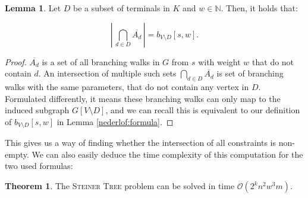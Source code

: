 \documentclass[thesis=M,english,hidelinks]{FITthesis}[2012/10/20]
\theoremstyle{definition}
\newtheorem{theorem}{Theorem}
\newtheorem{lemma}{Lemma}
\begin{document}
\begin{lemma}
    \label{nederlof:subset}
    Let $D$ be a subset of terminals in $K$ and $w \in \mathbb{N}$. Then, it holds
    that:

    $$
    \left\lvert\,\bigcap_{d \in D} \overline{A_d}\,\right\rvert = b_{V \setminus D}[s, w].
    $$

\end{lemma}

\begin{proof}
    $\overline{A_d}$ is a set of all branching walks in $G$ from $s$ with weight $w$ that do not contain $d$. An
    intersection of multiple such sets $\bigcap_{d \in D} \overline{A_d}$ is set of branching walks with the same
    parameters, that do not contain any vertex in $D$. Formulated differently, it means these branching walks can only
    map to the induced subgraph $G[V \setminus D]$, and we can recall this is equivalent to our definition of $b_{V
    \setminus D}[s, w]$ in Lemma \ref{nederlof:formula}.
\end{proof}

This gives us a way of finding whether the intersection of all constraints is non-empty. We can also easily deduce the
time complexity of this computation for the two used formulas:

\begin{theorem}
    \label{nederlof:complexity}
    The \textsc{Steiner Tree} problem can be solved in time $\mathcal{O}(2^k n^2 w^3 m)$.
\end{theorem}
\end{document}
